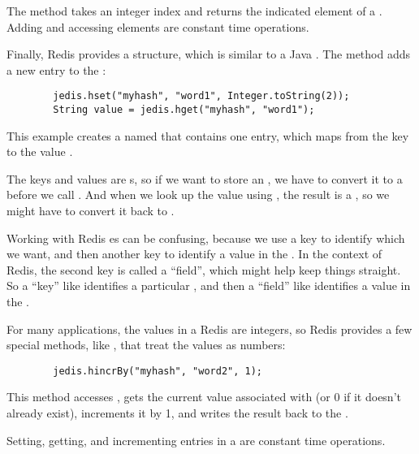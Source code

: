 \documentclass[12pt]{book}
\theoremstyle{exercise}
\begin{document}

The method  takes an integer index and returns the
indicated element of a . Adding and accessing elements are
constant time operations.

Finally, Redis provides a  structure, which is similar to a Java
. The method
 adds a new entry to the :

\begin{verbatim}
        jedis.hset("myhash", "word1", Integer.toString(2));
        String value = jedis.hget("myhash", "word1");
\end{verbatim}

This example creates a  named  that contains one
entry, which maps from the key  to the value .

The keys and values are s, so if we want to store
an , we have to convert it to
a  before we call . 
And when we look up the value using ,
the result is a , so we might have to convert it back
to .


Working with Redis es can be confusing, because we use a key to
identify which  we want, and then another key to identify a value in
the . In the context of Redis, the second key is called a ``field'',
which might help keep things straight. So a ``key'' like 
identifies a particular , and then a ``field'' like 
identifies a value in the .

For many applications, the values in a Redis  are integers, so Redis
provides a few special methods, like , that treat the
values as numbers:

\begin{verbatim}
        jedis.hincrBy("myhash", "word2", 1);
\end{verbatim}

This method accesses , gets the current value associated
with  (or 0 if it doesn't already exist), increments it by
1, and writes the result back to the .

Setting, getting, and incrementing entries in a  are constant time
operations.

\end{document}
